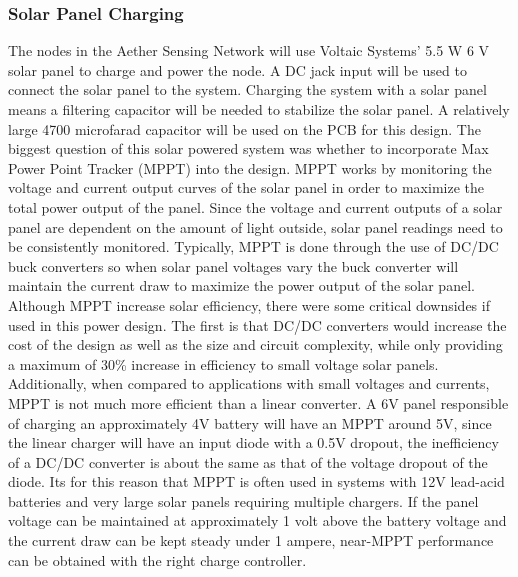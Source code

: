 \subsubsection{Solar Panel Charging}
The nodes in the Aether Sensing Network will use Voltaic Systems’ 5.5 W 6 V solar panel to charge and power the node. A DC jack input will be used to connect the solar panel to the system. Charging the system with a solar panel means a filtering capacitor will be needed to stabilize the solar panel. A relatively large 4700 microfarad capacitor will be used on the PCB for this design. The biggest question of this solar powered system was whether to incorporate Max Power Point Tracker (MPPT) into the design. MPPT works by monitoring the voltage and current output curves of the solar panel in order to maximize the total power output of the panel. Since the voltage and current outputs of a solar panel are dependent on the amount of light outside, solar panel readings need to be consistently monitored. Typically, MPPT is done through the use of DC/DC buck converters so when solar panel voltages vary the buck converter will maintain the current draw to maximize the power output of the solar panel. Although MPPT increase solar efficiency, there were some critical downsides if used in this power design. The first is that DC/DC converters would increase the cost of the design as well as the size and circuit complexity, while only providing a maximum of 30\% increase in efficiency to small voltage solar panels. Additionally, when compared to applications with small voltages and currents, MPPT is not much more efficient than a linear converter. A 6V panel responsible of charging an approximately 4V battery will have an MPPT around 5V, since the linear charger will have an input diode with a 0.5V dropout, the inefficiency of a DC/DC converter is about the same as that of the voltage dropout of the diode. Its for this reason that MPPT is often used in systems with 12V lead-acid batteries and very large solar panels requiring multiple chargers. If the panel voltage can be maintained at approximately 1 volt above the battery voltage and the current draw can be kept steady under 1 ampere, near-MPPT performance can be obtained with the right charge controller.

